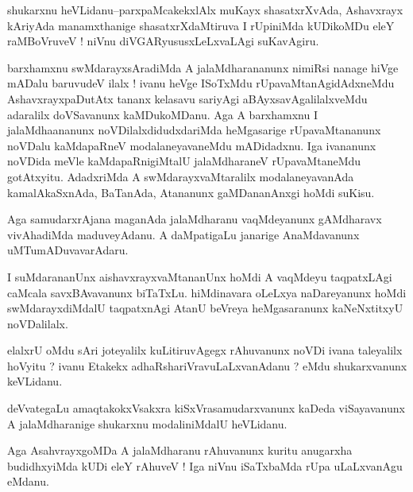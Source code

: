 \documentclass{article}
\begin{document}
\begin{mn}%
shukarxnu heVLidanu--parxpaMcakekxlAlx muKayx shasatxrXvAda, Ashavxrayx kAriyAda 
manamxthanige shasatxrXdaMtiruva I rUpiniMda kUDikoMDu eleY raMBoVruveV ! niVnu 
diVGARyususxLeLxvaLAgi suKavAgiru.
\end{mn}

\begin{mn}%
barxhamxnu swMdarayxsAradiMda A jalaMdharananunx nimiRsi nanage hiVge mADalu baruvudeV ilalx 
! ivanu heVge ISoTxMdu rUpavaMtanAgidAdxneMdu AshavxrayxpaDutAtx tananx kelasavu sariyAgi 
aBAyxsavAgalilalxveMdu adaralilx doVSavanunx kaMDukoMDanu. Aga A barxhamxnu I 
jalaMdhaananunx noVDilalxdidudxdariMda heMgasarige rUpavaMtananunx noVDalu kaMdapaRneV 
modalaneyavaneMdu mADidadxnu. Iga ivananunx noVDida meVle kaMdapaRnigiMtalU jalaMdharaneV 
rUpavaMtaneMdu gotAtxyitu. AdadxriMda A swMdarayxvaMtaralilx modalaneyavanAda 
kamalAkaSxnAda, BaTanAda, Atananunx gaMDananAnxgi hoMdi suKisu.
\end{mn}

\begin{mn}%
Aga samudarxrAjana maganAda jalaMdharanu vaqMdeyanunx gAMdharavx vivAhadiMda maduveyAdanu. A 
daMpatigaLu janarige AnaMdavanunx uMTumADuvavarAdaru.
\end{mn}

\begin{mn}%
I suMdarananUnx aishavxrayxvaMtananUnx hoMdi A vaqMdeyu taqpatxLAgi caMcala savxBAvavanunx 
biTaTxLu. hiMdinavara oLeLxya naDareyanunx hoMdi swMdarayxdiMdalU taqpatxnAgi AtanU beVreya 
heMgasaranunx kaNeNxtitxyU noVDalilalx.
\end{mn}

\begin{mn}%
elalxrU oMdu sAri joteyalilx kuLitiruvAgegx rAhuvanunx noVDi ivana taleyalilx hoVyitu ? 
ivanu Etakekx adhaRshariVravuLaLxvanAdanu ? eMdu shukarxvanunx keVLidanu.
\end{mn}

\begin{mn}%
deVvategaLu amaqtakokxVsakxra kiSxVrasamudarxvanunx kaDeda viSayavanunx A jalaMdharanige 
shukarxnu modaliniMdalU heVLidanu.
\end{mn}

\begin{mn}%
Aga AsahvrayxgoMDa A jalaMdharanu rAhuvanunx kuritu anugarxha budidhxyiMda kUDi eleY rAhuveV 
! Iga niVnu iSaTxbaMda rUpa uLaLxvanAgu eMdanu.
\end{mn}
\end{document}

